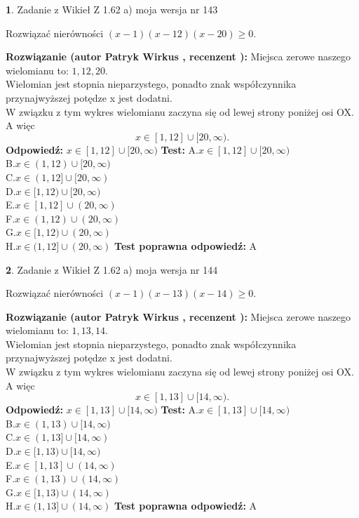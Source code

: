 \documentclass[12pt, a4paper]{article}
\theoremstyle{definition} %
\newtheorem{zad}{}
\newcommand{\zadStart}[1]{\begin{zad}#1\newline}
\newcommand{\zadStop}{\end{zad}}
\newcommand{\rozwStart}[2]{\noindent \textbf{Rozwiązanie (autor #1 , recenzent #2): }\newline}
\newcommand{\rozwStop}{\newline}
\newcommand{\odpStart}{\noindent \textbf{Odpowiedź:}\newline}
\newcommand{\odpStop}{\newline}
\newcommand{\testStart}{\noindent \textbf{Test:}\newline}
\newcommand{\testStop}{\newline}
\newcommand{\kluczStart}{\noindent \textbf{Test poprawna odpowiedź:}\newline}
\newcommand{\kluczStop}{\newline}
\begin{document}
\zadStart{Zadanie z Wikieł Z 1.62 a) moja wersja nr 143}

Rozwiązać nierówności $(x-1)(x-12)(x-20)\ge0$.
\zadStop
\rozwStart{Patryk Wirkus}{}
Miejsca zerowe naszego wielomianu to: $1, 12, 20$.\\
Wielomian jest stopnia nieparzystego, ponadto znak współczynnika przy\linebreak najwyższej potędze x jest dodatni.\\ W związku z tym wykres wielomianu zaczyna się od lewej strony poniżej osi OX. A więc $$x \in [1,12] \cup [20,\infty).$$
\rozwStop
\odpStart
$x \in [1,12] \cup [20,\infty)$
\odpStop
\testStart
A.$x \in [1,12] \cup [20,\infty)$\\
B.$x \in (1,12) \cup [20,\infty)$\\
C.$x \in (1,12] \cup [20,\infty)$\\
D.$x \in [1,12) \cup [20,\infty)$\\
E.$x \in [1,12] \cup (20,\infty)$\\
F.$x \in (1,12) \cup (20,\infty)$\\
G.$x \in [1,12) \cup (20,\infty)$\\
H.$x \in (1,12] \cup (20,\infty)$
\testStop
\kluczStart
A
\kluczStop



\zadStart{Zadanie z Wikieł Z 1.62 a) moja wersja nr 144}

Rozwiązać nierówności $(x-1)(x-13)(x-14)\ge0$.
\zadStop
\rozwStart{Patryk Wirkus}{}
Miejsca zerowe naszego wielomianu to: $1, 13, 14$.\\
Wielomian jest stopnia nieparzystego, ponadto znak współczynnika przy\linebreak najwyższej potędze x jest dodatni.\\ W związku z tym wykres wielomianu zaczyna się od lewej strony poniżej osi OX. A więc $$x \in [1,13] \cup [14,\infty).$$
\rozwStop
\odpStart
$x \in [1,13] \cup [14,\infty)$
\odpStop
\testStart
A.$x \in [1,13] \cup [14,\infty)$\\
B.$x \in (1,13) \cup [14,\infty)$\\
C.$x \in (1,13] \cup [14,\infty)$\\
D.$x \in [1,13) \cup [14,\infty)$\\
E.$x \in [1,13] \cup (14,\infty)$\\
F.$x \in (1,13) \cup (14,\infty)$\\
G.$x \in [1,13) \cup (14,\infty)$\\
H.$x \in (1,13] \cup (14,\infty)$
\testStop
\kluczStart
A
\kluczStop
\end{document}
